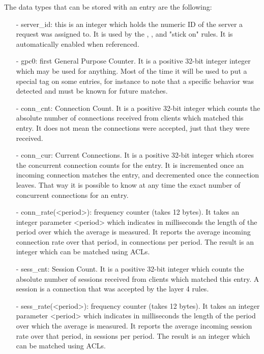   The data types that can be stored with an entry are the following:
  \begin{itemize}
  \item[-] server\_id: this is an integer which holds the numeric ID of the server a
      request was assigned to. It is used by the , ,
      and "stick on" rules. It is automatically enabled when referenced.

  \item[-] gpc0: first General Purpose Counter. It is a positive 32-bit integer
      integer which may be used for anything. Most of the time it will be used
      to put a special tag on some entries, for instance to note that a
      specific behavior was detected and must be known for future matches.

  \item[-] conn\_cnt: Connection Count. It is a positive 32-bit integer which counts
      the absolute number of connections received from clients which matched
      this entry. It does not mean the connections were accepted, just that
      they were received.

  \item[-] conn\_cur: Current Connections. It is a positive 32-bit integer which
      stores the concurrent connection counts for the entry. It is incremented
      once an incoming connection matches the entry, and decremented once the
      connection leaves. That way it is possible to know at any time the exact
      number of concurrent connections for an entry.

  \item[-] conn\_rate(<period>): frequency counter (takes 12 bytes). It takes an
      integer parameter <period> which indicates in milliseconds the length
      of the period over which the average is measured. It reports the average
      incoming connection rate over that period, in connections per period. The
      result is an integer which can be matched using ACLs.

  \item[-] sess\_cnt: Session Count. It is a positive 32-bit integer which counts
      the absolute number of sessions received from clients which matched this
      entry. A session is a connection that was accepted by the layer 4 rules.

  \item[-] sess\_rate(<period>): frequency counter (takes 12 bytes). It takes an
      integer parameter <period> which indicates in milliseconds the length
      of the period over which the average is measured. It reports the average
      incoming session rate over that period, in sessions per period. The
      result is an integer which can be matched using ACLs.


\end{itemize}
